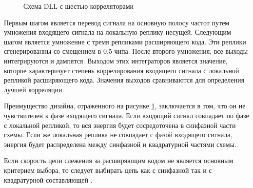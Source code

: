 \begin{figure}[H]
\begin{center}
\end{center}
\caption{Схема DLL с шестью корреляторами}
\label{pic:dll}
\end{figure}

Первым шагом является перевод сигнала на основную полосу частот путем умножения входящего сигнала на локальную реплику
несущей. Следующим шагом является умножение с тремя репликами расширяющего кода. Эти реплики сгенерированны со 
смещением в 0.5 чипа. После второго умножения, все выходы интегрируются и дампятся. Выходом этих интеграторов является
значение, которое характеризует степень коррелирования входящего сигнала с локальной репликой расширяющего кода.
Значения выходов сравниваются для определения лучшей корреляции.

Преимущество дизайна, отраженного на рисунке \ref{pic:dll}, заключается в том, что он не чувствителен к фазе входящего
сигнала. Если входящий сигнал совпадает по фазе с локальной репликой, то вся энергия будет сосредоточена в 
синфазной части схемы. Если же локальная реплика не совпадает с фазой входящего сигнала, энергия будет
распределена между синфазной и квадратурной частями схемы.

Если скорость цепи слежения за расширяющим кодом не является основным критерием выбора, то следует выбирать
цепь как с синфазной так и с квадратурной составляющей \cite{gps}.

\newpage
